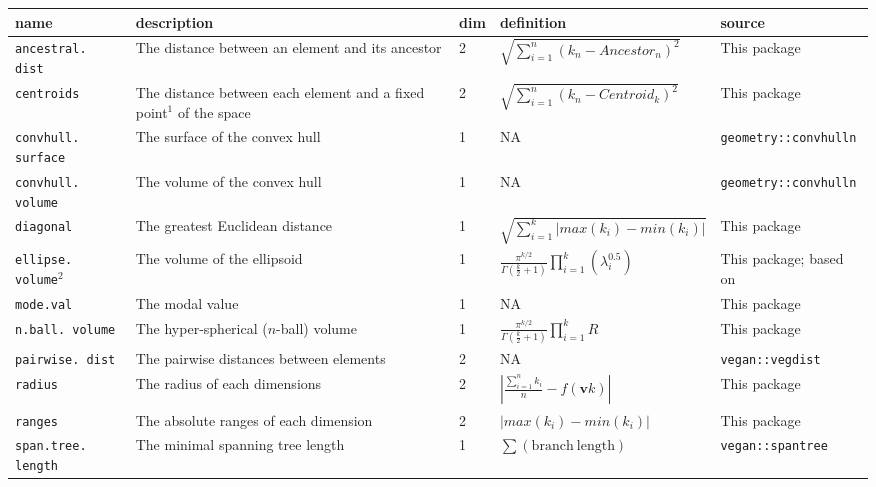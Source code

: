 \documentclass[12pt,letterpaper]{article}
\begin{document}
\begin{table}[H]
\resizebox{\textwidth}{!}
{%
    \begin{tabular}{p{2cm}|p{5cm}|p{1cm}|p{5cm}|p{5cm}}
        \textbf{name} & \textbf{description} & \textbf{dim} & \textbf{definition} & \textbf{source} \\
        \hline
        \texttt{ancestral. dist} & The distance between an element and its ancestor & 2 & $\sqrt{\sum_{i=1}^{n}{({k}_{n}-Ancestor_{n})^2}}$ & This package \\
        \hline
        \texttt{centroids} & The distance between each element and a fixed point$^1$ of the space & 2 & $\sqrt{\sum_{i=1}^{n}{({k}_{n}-Centroid_{k})^2}}$ & This package \\
        \hline
        \texttt{convhull. surface} & The surface of the convex hull & 1 & NA & \texttt{geometry::convhulln} \citep{barber1996quickhull,geometryR}\\
        \hline
        \texttt{convhull. volume} & The volume of the convex hull & 1 & NA & \texttt{geometry::convhulln} \citep{barber1996quickhull,geometryR}\\
        \hline
        \texttt{diagonal} & The greatest Euclidean distance & 1 & $\sqrt{\sum_{i=1}^{k}|max(k_i) - min(k_i)|}$ & This package \\
        \hline
        \texttt{ellipse. volume}$^2$ & The volume of the ellipsoid & 1 & $\frac{\pi^{k/2}}{\Gamma(\frac{k}{2}+1)}\displaystyle\prod_{i=1}^{k} (\lambda_{i}^{0.5})$ & This package; based on \cite{DonohueDim}\\
        \hline
        \texttt{mode.val} & The modal value & 1 & NA & This package\\
        \hline
        \texttt{n.ball. volume} & The hyper-spherical ($n$-ball) volume & 1 & $\frac{\pi^{k/2}}{\Gamma(\frac{k}{2}+1)}\displaystyle\prod_{i=1}^{k} R$ & This package\\
        \hline
        \texttt{pairwise. dist} & The pairwise distances between elements & 2 & NA & \texttt{vegan::vegdist} \citep{oksanen2007vegan}\\        
        \hline
        \texttt{radius} & The radius of each dimensions & 2 & $|\frac{\sum_{i=1}^{n}k_i}{n} - f(\mathbf{v}k)|$ & This package\\
        \hline
        \texttt{ranges} & The absolute ranges of each dimension & 2 & $|max(k_i) - min(k_i)|$ & This package \\
        \hline
        \texttt{span.tree. length} & The minimal spanning tree length & 1 & $\sum(\mathrm{branch\ length})$ & \texttt{vegan::spantree} \citep{oksanen2007vegan}\\

\end{tabular}}
\end{table}
\end{document}
